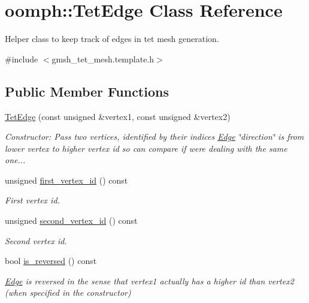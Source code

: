 \hypertarget{classoomph_1_1TetEdge}{}\section{oomph\+:\+:Tet\+Edge Class Reference}
\label{classoomph_1_1TetEdge}


Helper class to keep track of edges in tet mesh generation.  




{\ttfamily \#include $<$gmsh\+\_\+tet\+\_\+mesh.\+template.\+h$>$}

\subsection*{Public Member Functions}
\begin{DoxyCompactItemize}
\item 
\hyperlink{classoomph_1_1TetEdge_aa50127a0f255985cced5d90ec2325c0c}{Tet\+Edge} (const unsigned \&vertex1, const unsigned \&vertex2)
\begin{DoxyCompactList}\small\item\em Constructor\+: Pass two vertices, identified by their indices \hyperlink{classoomph_1_1Edge}{Edge} \char`\"{}direction\char`\"{} is from lower vertex to higher vertex id so can compare if we\textquotesingle{}re dealing with the same one... \end{DoxyCompactList}\item 
unsigned \hyperlink{classoomph_1_1TetEdge_acc26fa59e15615e1620fade6f9d1bbe1}{first\+\_\+vertex\+\_\+id} () const
\begin{DoxyCompactList}\small\item\em First vertex id. \end{DoxyCompactList}\item 
unsigned \hyperlink{classoomph_1_1TetEdge_a5ab63d3dece25fd81b5dad00b7fc8b3f}{second\+\_\+vertex\+\_\+id} () const
\begin{DoxyCompactList}\small\item\em Second vertex id. \end{DoxyCompactList}\item 
bool \hyperlink{classoomph_1_1TetEdge_a9a124de5c191e1b0e43ed92c2a867c55}{is\+\_\+reversed} () const
\begin{DoxyCompactList}\small\item\em \hyperlink{classoomph_1_1Edge}{Edge} is reversed in the sense that vertex1 actually has a higher id than vertex2 (when specified in the constructor) \end{DoxyCompactList}\item 

\end{DoxyCompactItemize}
